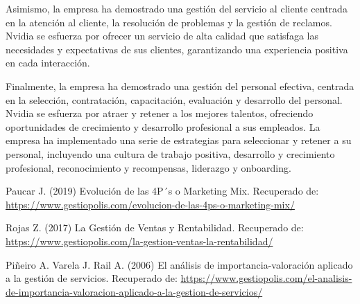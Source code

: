 \documentclass{article}
\begin{document}
Asimismo, la empresa ha demostrado una gestión del servicio al cliente centrada en la atención al cliente, la resolución de problemas y la gestión de reclamos. Nvidia se esfuerza por ofrecer un servicio de alta calidad que satisfaga las necesidades y expectativas de sus clientes, garantizando una experiencia positiva en cada interacción.

Finalmente, la empresa ha demostrado una gestión del personal efectiva, centrada en la selección, contratación, capacitación, evaluación y desarrollo del personal. Nvidia se esfuerza por atraer y retener a los mejores talentos, ofreciendo oportunidades de crecimiento y desarrollo profesional a sus empleados. La empresa ha implementado una serie de estrategias para seleccionar y retener a su personal, incluyendo una cultura de trabajo positiva, desarrollo y crecimiento profesional, reconocimiento y recompensas, liderazgo y onboarding.

\newpage

\begin{thebibliography}{9}

  Paucar J. (2019) Evolución de las 4P´s o Marketing Mix. Recuperado de: \url{https://www.gestiopolis.com/evolucion-de-las-4ps-o-marketing-mix/}

  Rojas Z. (2017) La Gestión de Ventas y Rentabilidad. Recuperado de: \url{https://www.gestiopolis.com/la-gestion-ventas-la-rentabilidad/}

  Piñeiro A. Varela J. Rail A. (2006) El análisis de importancia-valoración aplicado a la gestión de servicios. Recuperado de: \url{https://www.gestiopolis.com/el-analisis-de-importancia-valoracion-aplicado-a-la-gestion-de-servicios/}

\end{thebibliography}

  
\end{document}
